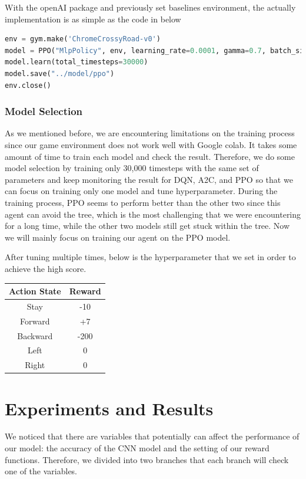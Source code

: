 \documentclass{article}
\begin{document}
With the openAI package and previously set baselines environment, the actually implementation is as simple as the code in below
\begin{lstlisting}[language = Python]
env = gym.make('ChromeCrossyRoad-v0')
model = PPO("MlpPolicy", env, learning_rate=0.0001, gamma=0.7, batch_size=1024, verbose=1, tensorboard_log ="./log/ppo_crossy_road_tensorboard/")
model.learn(total_timesteps=30000)
model.save("../model/ppo")
env.close()
\end{lstlisting}

\subsubsection{Model Selection}
As we mentioned before, we are encountering limitations on the training process since our game environment does not work well with Google colab. It takes some amount of time to train each model and check the result. Therefore, we do some model selection by training only 30,000 timesteps with the same set of parameters and keep monitoring the result for DQN, A2C, and PPO so that we can focus on training only one model and tune hyperparameter. During the training process, PPO seems to perform better than the other two since this agent can avoid the tree, which is the most challenging that we were encountering for a long time, while the other two models still get stuck within the tree. Now we will mainly focus on training our agent on the PPO model. \par 

After tuning multiple times, below is the hyperparameter that we set in order to achieve the high score. \par 

\begin{center}
    \begin{tabular}{ | c | c |} 
        \hline
        Action State & Reward \\ 
        \hline
        Stay & -10\\ 
        \hline
        Forward & +7\\ 
        \hline
        Backward & -200 \\ 
        \hline
        Left & 0 \\
        \hline
        Right & 0 \\ 
        \hline
    \end{tabular}   
\end{center}

\section{Experiments and Results}
We noticed that there are variables that potentially can affect the performance of our model: the accuracy of the CNN model and the setting of our reward functions. Therefore, we divided into two branches that each branch will check one of the variables. 
\end{document}
